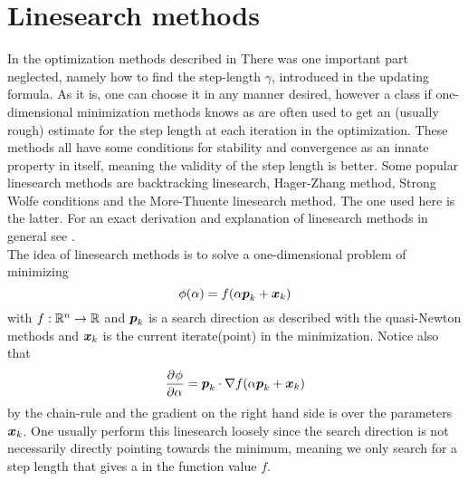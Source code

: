 \section{Linesearch methods\label{sec:linesearch_methods}}
    In the optimization methods described in
     There was one important
    part neglected, namely how to find the step-length $\gamma$, introduced in
    the updating formula. As it is, one can choose it in any manner desired,
    however a class if one-dimensional minimization methods knows as
     are often used to get an (usually rough)
    estimate for the step length at each iteration in the optimization. These
    methods all have some conditions for stability and convergence as an innate
    property in itself, meaning the validity of the step length is
    better. Some popular linesearch methods are
    backtracking linesearch, Hager-Zhang method, Strong Wolfe conditions and
    the More-Thuente linesearch method. The one used here is the latter. For an
    exact derivation and explanation of linesearch methods in general see
    \cite{numOptNocWrig}. \\
    The idea of linesearch methods is to solve a one-dimensional problem of
    minimizing
        \begin{equation}
            \phi(\alpha) = f(\alpha \boldsymbol{{p}}_k + \boldsymbol{{x}}_k)
        \end{equation}
    with $f:\mathbb{R}^n\rightarrow\mathbb{R}$ and $\boldsymbol{{p}}_k$ is a search direction
    as described with the quasi-Newton methods and $\boldsymbol{{x}}_k$ is the current
    iterate(point) in the minimization. Notice also that
        \begin{equation}
            \prd{\alpha}[\phi] = \blds{p}_k \cdot \nabla f(\alpha \blds{p}_k +
            \blds{x}_k)
        \end{equation}
    by the chain-rule and the gradient on the right hand side is over the
    parameters $\boldsymbol{{x}}_k$. One usually perform this linesearch loosely since
    the search direction is not necessarily directly pointing towards the
    minimum, meaning we only search for a step length that gives a
     in the function value $f$.
